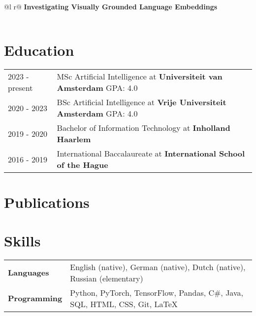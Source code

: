 \documentclass[a4paper,12pt]{article}
\begin{document}
\begin{tabularx}{\linewidth}{ @{}l r@{} }
\textbf{Investigating Visually Grounded Language Embeddings}\\%
\\
\end{tabularx}

\section{Education}
\begin{tabularx}{\linewidth}{@{}l X@{}}	
2023 - present & MSc Artificial Intelligence at \textbf{Universiteit van Amsterdam} \hfill \normalsize GPA: 4.0 \\

2020 - 2023 & BSc Artificial Intelligence at \textbf{Vrije Universiteit Amsterdam} \hfill GPA: 4.0 \\ 

2019 - 2020 & Bachelor of Information Technology at \textbf{Inholland Haarlem}\hfill  \\

2016 - 2019 & International Baccalaureate at \textbf{International School of the Hague} \hfill  \\
\end{tabularx}

\section{Publications}
\begin{refsection}
\nocite{*}
\printbibliography[heading=none]
\end{refsection}

\section{Skills}
\begin{tabularx}{\linewidth}{@{}l X@{}}
\textbf{Languages} & English (native), German (native), Dutch (native), Russian (elementary) \\
\textbf{Programming} & Python, PyTorch, TensorFlow, Pandas, C\#, Java, SQL, HTML, CSS, Git, \LaTeX
\end{tabularx}

\vfill
{}
\end{document}
